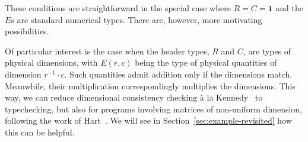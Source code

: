 \documentclass{IMEKO2024}
\newcommand{\istype}[1]{#1\ \textsf{type}}
\newcommand{\isadd}[1]{#1\ \textsf{numeric}}
\newcommand{\ismult}[3]{(#1, #2, #3)\ \textsf{multipliable}}
\newcommand{\One}{\mathbf{1}}
\newcommand{\Matrix}[5]{\mathsf{Matrix}\,#1\,#2\,#3\,#4\,#5}
\newcommand{\List}[1]{\mathsf{List}\,#1}
\begin{document}
These conditions are straightforward in the special case where $R = C = \One$ and the $E$s are standard numerical types. There are, however, more motivating possibilities.

Of particular interest is the case when the header types, $R$ and
$C$, are types of physical dimensions, with $E(r, c)$ being the
type of physical quantities of dimension $r^{-1}\cdot c$.
%
Such quantities admit addition only if the dimensions match. Meanwhile, their multiplication correspondingly multiplies the dimensions.
%
This way, we can reduce dimensional consistency checking \`a la
Kennedy~\cite{kennedyUOM} to typechecking, but also for programs involving matrices of non-uniform dimension, following the work of Hart~\cite{hart}.
%
We will see in Section~\ref{sec:example-revisited} how this can be helpful.


%
\end{document}
